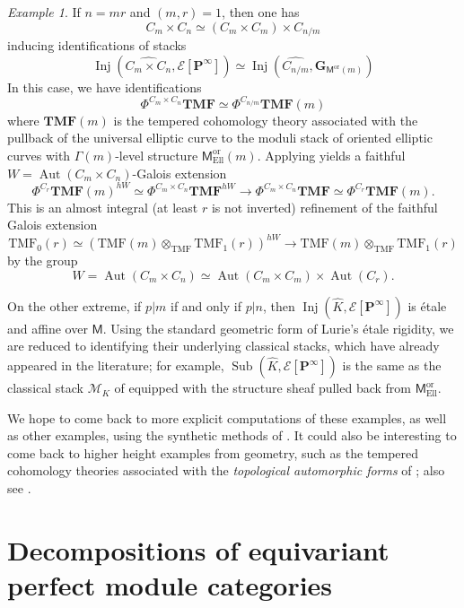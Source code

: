 \documentclass[11pt, a4paper]{article}
\newcommand{\Ell}{\mathrm{Ell}}
\newcommand{\ori}{\mathrm{or}}
\newcommand{\1}{\mathbf{1}}
\newcommand{\gTMF}{{\mathbf{TMF}}}
\newcommand{\TMF}{\mathrm{TMF}}
\DeclareMathOperator{\Inj}{Inj}
\DeclareMathOperator{\Sub}{Sub}
\DeclareMathOperator{\Aut}{Aut}
\newcommand{\dual}[1]{{\widehat{#1}}}
\newcommand{\calE}{\mathcal{E}}
\newcommand{\G}{\mathbf{G}}
\newcommand{\M}{\mathsf{M}}
\renewcommand{\P}{\mathbf{P}}
\newcommand{\Ga}{\Gamma}
\theoremstyle{plain}
\theoremstyle{definition}
\theoremstyle{remark}\numberwithin{equation}{section}
\newtheorem{example}[equation]{Example}
\begin{document}
\begin{example}
    If $n=mr$ and $(m,r)=1$, then one has
    \[C_m \times C_n \simeq (C_m\times C_m)\times C_{n/m}\]
    inducing identifications of stacks
    \[\Inj(\dual{C_m \times C_n}, \calE[\P^\infty]) \simeq \Inj(\dual{C_{n/m}}, \G_{\M^\ori(m)})\]
    In this case, we have identifications
    \[ \Phi^{C_m \times C_n} \gTMF \simeq \Phi^{C_{n/m}} \gTMF(m)\]
    where $\gTMF(m)$ is the tempered cohomology theory associated with the pullback of the universal elliptic curve to the moduli stack of oriented elliptic curves with $\Ga(m)$-level structure $\M_\Ell^\ori(m)$. Applying  yields a faithful $W=\Aut(C_m \times C_n)$-Galois extension
    \[\Phi^{C_{r}} \gTMF(m)^{hW} \simeq \Phi^{C_m \times C_n} \gTMF^{hW} \to \Phi^{C_m \times C_n} \gTMF \simeq \Phi^{C_{r}} \gTMF(m).\]
    This is an almost integral (at least $r$ is not inverted) refinement of the faithful Galois extension
    \[\TMF_0(r) \simeq (\TMF(m) \otimes_{\TMF} \TMF_1(r))^{hW} \to \TMF(m) \otimes_{\TMF} \TMF_1(r)\]
    by the group
    \[W = \Aut(C_m \times C_n) \simeq \Aut(C_m \times C_m) \times \Aut(C_{r}).\]
\end{example}

On the other extreme, if $p|m$ if and only if $p|n$, then $\Inj(\dual{K}, \calE[\P^\infty])$ is étale and affine over $\M$. Using the standard geometric form of Lurie's étale rigidity, we are reduced to identifying their underlying classical stacks, which have already appeared in the literature; for example, $\Sub(\dual{K}, \calE[\P^\infty])$ is the same as the classical stack $\mathcal{M}_K$ of \cite[Def.2.26]{heckeontmf} equipped with the structure sheaf pulled back from $\M_\Ell^\ori$. 

We hope to come back to more explicit computations of these examples, as well as other examples, using the synthetic methods of \cite{smfcomputation,osyn,chua_c2TMF}. It could also be interesting to come back to higher height examples from geometry, such as the tempered cohomology theories associated with the \emph{topological automorphic forms} of \cite{taf}; also see \cite[]{luriestheorem}.

\section{Decompositions of equivariant perfect module categories}\label{sec:categorical_decompositions}
\end{document}
